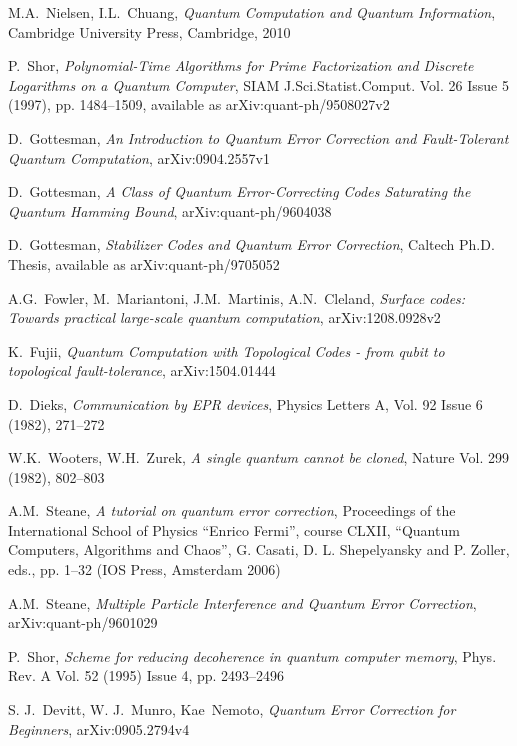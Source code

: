 \documentclass[a4paper, draft]{article}
\theoremstyle{own}
\theoremstyle{remark}
\begin{document}
\begin{thebibliography}{9}


M.A.~Nielsen, I.L.~Chuang, \emph{Quantum Computation and Quantum Information},
Cambridge University Press, Cambridge, 2010

P.~Shor, \emph{Polynomial-Time Algorithms for Prime Factorization and Discrete Logarithms on a Quantum Computer}, SIAM J.Sci.Statist.Comput. Vol. 26 Issue 5 (1997), pp. 1484--1509, available as arXiv:quant-ph/9508027v2


D.~Gottesman, \emph{An Introduction to Quantum Error Correction and Fault-Tolerant Quantum Computation}, arXiv:0904.2557v1

D.~Gottesman, \emph{A Class of Quantum Error-Correcting Codes Saturating the Quantum Hamming Bound}, arXiv:quant-ph/9604038

D.~Gottesman, \emph{Stabilizer Codes and Quantum Error Correction}, Caltech Ph.D. Thesis, available as  arXiv:quant-ph/9705052

A.G.~Fowler, M.~Mariantoni, J.M.~Martinis, A.N.~Cleland, \emph{Surface codes: Towards practical large-scale quantum computation}, arXiv:1208.0928v2

K.~Fujii, \emph{Quantum Computation with Topological Codes - from qubit to topological fault-tolerance}, 	arXiv:1504.01444 

D.~Dieks, \emph{Communication by EPR devices}, Physics Letters A, Vol. 92 Issue 6 (1982), 271--272

W.K.~Wooters, W.H.~Zurek, \emph{A single quantum cannot be cloned}, Nature Vol. 299 (1982), 802--803

A.M.~Steane, \emph{A tutorial on quantum error correction}, Proceedings of the International School of Physics “Enrico Fermi”, course CLXII, “Quantum Computers,
Algorithms and Chaos”, G. Casati, D. L. Shepelyansky and P. Zoller, eds., pp. 1–32 (IOS Press, Amsterdam 2006)

A.M.~Steane, \emph{Multiple Particle Interference and Quantum Error Correction}, 	arXiv:quant-ph/9601029

P.~Shor, \emph{Scheme for reducing decoherence in quantum computer memory},
Phys. Rev. A Vol. 52 (1995) Issue 4, pp. 2493--2496 

S. J.~Devitt, W. J.~Munro, Kae~Nemoto, \emph{Quantum Error Correction for Beginners},
arXiv:0905.2794v4


\end{thebibliography}
\end{document}
